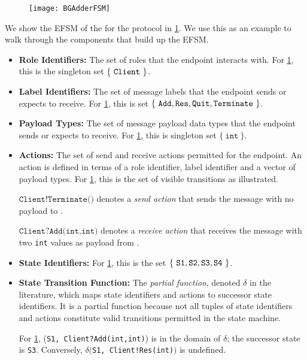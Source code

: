 \begin{figure}[!h]
\centering
\texttt{[image: BGAdderFSM]}
\label{fig:bgadderfsm}
\end{figure}

We show the EFSM of the  for the
 protocol in \cref{fig:bgadderfsm}.
We use this as an example to walk through
the components that build up the EFSM.

\begin{itemize}

\item \textbf{Role Identifiers:}
The set of roles that the endpoint interacts with.
For \cref{fig:bgadderfsm}, this is the singleton set
$\{~\texttt{Client}~\}$.

\item \textbf{Label Identifiers:}
The set of message labels that the endpoint sends or
expects to receive.
For \cref{fig:bgadderfsm}, this is set
$\{~\texttt{Add}, \texttt{Res}, \texttt{Quit}, \texttt{Terminate}~\}$.

\item \textbf{Payload Types:}
The set of message payload data types that the endpoint
sends or expects to receive.
For \cref{fig:bgadderfsm}, this is singleton set
$\{~\texttt{int}~\}$.

\item \textbf{Actions:}
The set of send and receive actions permitted for the endpoint.
An action is defined in terms of a role identifier,
label identifier and a vector of payload types.
For \cref{fig:bgadderfsm}, this is the set of visible
transitions as illustrated.

$\texttt{Client!Terminate()}$ denotes a \textit{send action}
that sends the  message with 
no payload to .

$\texttt{Client?Add(int,int)}$ denotes a \textit{receive action}
that receives the  message with two \texttt{int}
values as payload from .

\item \textbf{State Identifiers:}
For \cref{fig:bgadderfsm}, this is the set 
$\{~ \texttt{S1}, \texttt{S2}, \texttt{S3}, \texttt{S4}~\}$.

\item \textbf{State Transition Function:}
The \textit{partial function}, denoted $\delta$ in the literature,
which maps state identifiers and actions to
successor state identifiers.
It is a partial function because not all tuples
of state identifiers and actions constitute valid transitions
permitted in the state machine.

For \cref{fig:bgadderfsm},
(\texttt{S1, Client?Add(int,int)}) is in the domain
of $\delta$; the successor state is \texttt{S3}.
Conversely, $\delta($\texttt{S1, Client!Res(int)}$)$
is undefined.
\end{itemize}


